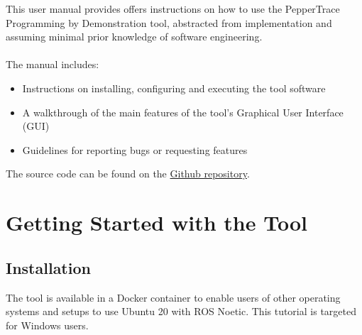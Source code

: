 \documentclass{CSSRforAfrica}
\begin{document}
This user manual provides offers instructions on how to use the PepperTrace Programming by Demonstration tool, abstracted from implementation and assuming minimal prior knowledge of software engineering. 
\\~\\
\noindent The manual includes:
\begin{itemize}
    \item Instructions on installing, configuring and executing the tool software
    \item A walkthrough of the main features of the tool's Graphical User Interface (GUI)
    \item Guidelines for reporting bugs or requesting features 
\end{itemize}

\noindent The source code can be found on the \href{https://github.com/danielcortezbarros/peppertrace}{Github repository}. 

\newpage



\section*{Getting Started with the Tool}
\subsection*{Installation}
The tool is available in a Docker container to enable users of other operating systems and setups to use Ubuntu 20 with ROS Noetic. This tutorial is targeted for Windows users.
\end{document}
